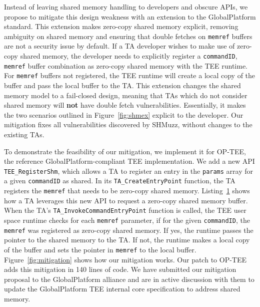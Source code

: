 Instead of leaving shared memory handling to developers and obscure APIs, we propose 
to mitigate this design weakness with an extension to the GlobalPlatform standard. This extension 
makes zero-copy shared memory explicit, removing ambiguity on shared memory and 
ensuring that double fetches on \texttt{memref} buffers are not a security issue by 
default. If a TA developer wishes to make use of zero-copy shared memory, the developer 
needs to explicitly register a \texttt{commandID},
\texttt{memref} buffer combination as zero-copy shared memory with the TEE runtime. 
For \texttt{memref} buffers not registered, the TEE runtime will create a local 
copy of the buffer and pass the local buffer to the TA. This extension changes 
the shared memory model to a fail-closed design, meaning that TAs which do not 
consider shared memory will \textbf{not} have double fetch vulnerabilities. 
Essentially, it makes the two scenarios outlined in Figure~\ref{fig:shmex} explicit 
to the developer. Our mitigation fixes all vulnerabilities discovered by SHMuzz, 
without changes to the existing TAs.

To demonstrate the feasibility of our mitigation, we implement it for OP-TEE, the 
reference GlobalPlatform-compliant TEE implementation. We add a new API \texttt{TEE\_RegisterShm}, 
which allows a TA to register an entry in the \texttt{params} array for a given 
\texttt{commandID} as shared. In its \texttt{TA\_CreateEntryPoint} function, the 
TA registers the \texttt{memref} that needs to be zero-copy shared memory. 
Listing~\ref{lst:mitigta} shows how a TA leverages this new API to request a
zero-copy shared memory buffer. When the TA's \texttt{TA\_InvokeCommandEntryPoint} function is called, the TEE user 
space runtime checks for each \texttt{memref} parameter, if for the given 
\texttt{commandID}, the \texttt{memref} was registered as zero-copy shared memory. 
If yes, the runtime passes the pointer to the shared memory to the TA. 
If not, the runtime makes a local copy of the 
buffer and sets the pointer in \texttt{memref} to the local buffer.
Figure~\ref{fig:mitigation} shows how our mitigation works.
Our patch to OP-TEE adds this mitigation in 140 lines 
of code.
We have submitted our mitigation proposal to the GlobalPlatform alliance and are 
in active discussion with them to update the GlobalPlatform TEE internal core 
specification to address shared memory.

\begin{figure}[h]
    
    \label{lst:mitigta}
\end{figure}